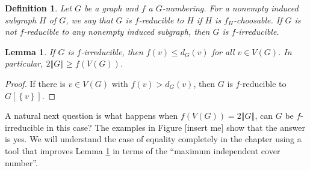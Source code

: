 \documentclass[openany]{tufte-book} %
\theoremstyle{plain}
\newtheorem{definition}{Definition}
\newtheorem{lemma}{Lemma}
\newcommand{\set}[1]{\left\{ #1 \right\}}
\newcommand{\size}[1]{\left\Vert#1\right\Vert}
\newcommand{\brackets}[1]{\left[ #1 \right]}
\begin{document}
\begin{definition}
Let $G$ be a graph and $f$ a $G$-numbering. For a nonempty induced subgraph $H$ of $G$, we say that \emph{$G$ is $f$-reducible to $H$} if $H$ is $f_H$-choosable.  If $G$
is not $f$-reducible to any nonempty induced subgraph, then $G$ is $f$-irreducible.
\end{definition}

\begin{lemma}\label{BasicIrreducible}
If $G$ is $f$-irreducible, then $f(v) \le d_G(v)$ for all $v \in V(G)$.  In particular, $2\size{G} \ge f(V(G))$.
\end{lemma}
\begin{proof}
If there is $v \in V(G)$ with $f(v) > d_G(v)$, then $G$ is $f$-reducible to $G\brackets{\set{v}}$.
\end{proof}

A natural next question is what happens when $f(V(G)) = 2\size{G}$, can $G$ be $f$-irreducible in this case?  The examples in Figure [insert me] show that the answer is yes.
We will understand the case of equality completely in the  chapter using a tool that improves Lemma \ref{BasicIrreducible} in terms of the ``maximum independent cover number''.
\end{document}
